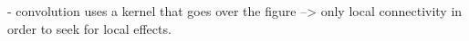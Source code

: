 \documentclass[a4paper,10pt]{article}
\begin{document}
- convolution uses a kernel that goes over the figure --> only local connectivity in order to seek for local effects. 









%
\end{document}
